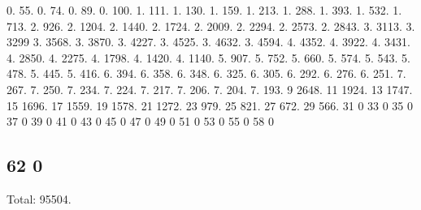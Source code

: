 0. 55. 0. 74. 0. 89. 0. 100. 1. 111. 1. 130. 1. 159. 1. 213. 1. 288. 1. 393. 1. 532. 1. 713. 2. 926. 2. 1204. 2. 1440. 2. 1724. 2. 2009. 2. 2294. 2. 2573. 2. 2843. 3. 3113. 3. 3299 3. 3568. 3. 3870. 3. 4227. 3. 4525. 3. 4632. 3. 4594. 4. 4352. 4. 3922. 4. 3431. 4. 2850. 4. 2275. 4. 1798. 4. 1420. 4. 1140. 5. 907. 5. 752. 5. 660. 5. 574. 5. 543. 5. 478. 5. 445. 5. 416. 6. 394. 6. 358. 6. 348. 6. 325. 6. 305. 6. 292. 6. 276. 6. 251. 7. 267. 7. 250. 7. 234. 7. 224. 7. 217. 7. 206. 7. 204. 7. 193. 9 2648. 11 1924. 13 1747. 15 1696. 17 1559. 19 1578. 21 1272. 23 979. 25 821. 27 672. 29 566. 31 0 33 0 35 0 37 0 39 0 41 0 43 0 45 0 47 0 49 0 51 0 53 0 55 0 58 0 \subsection*{62 0 }

Total\+: 95504. 
